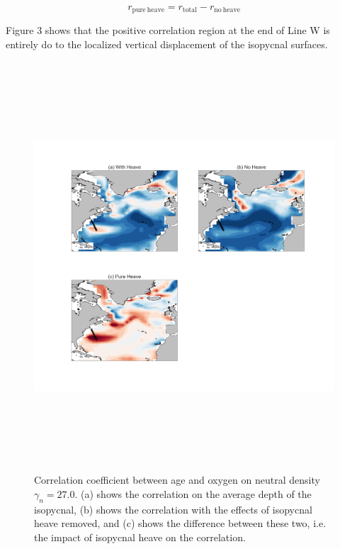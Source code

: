 \documentclass[11pt]{article}
\begin{document}
\begin{equation}
r_{\mathrm{pure\ heave}} = r_{\mathrm{total}} - r_{\mathrm{no\ heave}}
\end{equation}

Figure 3 shows that the positive correlation region at the end of Line W is entirely
do to the localized vertical displacement of the isopycnal surfaces.

\begin{figure}[t!]
    \centering
    \includegraphics[height=6in]{correlation_heave.png}
    \caption{Correlation coefficient between age and oxygen on neutral density
    $\gamma_n = 27.0$. (a) shows the correlation on the average depth of the
    isopycnal, (b) shows the correlation with the effects of isopycnal heave removed,
    and (c) shows the difference between these two, i.e. the impact of isopycnal
    heave on the correlation.
    }
\end{figure}


\clearpage
\end{document}
